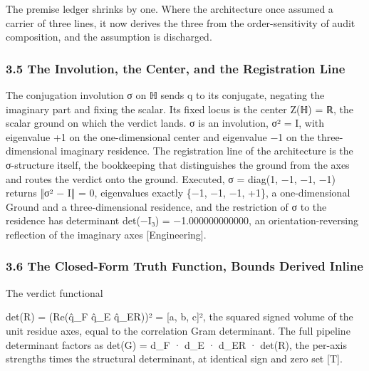 \documentclass[10pt,twocolumn]{article}
\begin{document}
The premise ledger shrinks by one. Where the architecture once assumed a
carrier of three lines, it now derives the three from the
order-sensitivity of audit composition, and the assumption is
discharged.

\hypertarget{the-involution-the-center-and-the-registration-line}{%
\subsubsection{3.5 The Involution, the Center, and the Registration
Line}\label{the-involution-the-center-and-the-registration-line}}

The conjugation involution σ on ℍ sends q to its conjugate, negating the
imaginary part and fixing the scalar. Its fixed locus is the center Z(ℍ)
= ℝ, the scalar ground on which the verdict lands. σ is an involution,
σ² = I, with eigenvalue +1 on the one-dimensional center and eigenvalue
−1 on the three-dimensional imaginary residence. The registration line
of the architecture is the σ-structure itself, the bookkeeping that
distinguishes the ground from the axes and routes the verdict onto the
ground. Executed, σ = diag(1, −1, −1, −1) returns ‖σ² − I‖ = 0,
eigenvalues exactly \{−1, −1, −1, +1\}, a one-dimensional Ground and a
three-dimensional residence, and the restriction of σ to the residence
has determinant det(−I₃) = −1.000000000000, an orientation-reversing
reflection of the imaginary axes {[}Engineering{]}.

\hypertarget{the-closed-form-truth-function-bounds-derived-inline}{%
\subsubsection{3.6 The Closed-Form Truth Function, Bounds Derived
Inline}\label{the-closed-form-truth-function-bounds-derived-inline}}

\begin{jbox}{The verdict functional}

det(R) = (Re(q̂\_F q̂\_E q̂\_ER))² = {[}a, b, c{]}², the squared signed
volume of the unit residue axes, equal to the correlation Gram
determinant. The full pipeline determinant factors as det(G) = d\_F ·
d\_E · d\_ER · det(R), the per-axis strengths times the structural
determinant, at identical sign and zero set {[}T{]}.

\end{jbox}
\end{document}
